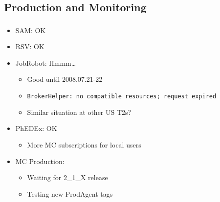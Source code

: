 \documentclass{beamer}
\begin{document}
\subsection{Production and Monitoring}
\begin{frame}
\frametitle{}
\begin{itemize}
    \item SAM: OK
    \item RSV: OK
    \item JobRobot: Hmmm\ldots{}
    \begin{itemize}
        \item Good until 2008.07.21-22
        \item {\tt BrokerHelper: no compatible resources; request expired}
        \item Similar situation at other US T2s?
    \end{itemize}
    \item PhEDEx: OK
    \begin{itemize}
        \item More MC subscriptions for local users
    \end{itemize}
    \item MC Production:
    \begin{itemize}
        \item Waiting for 2\_1\_X release
        \item Testing new ProdAgent tags
    \end{itemize}
\end{itemize}
\end{frame}
\end{document}
